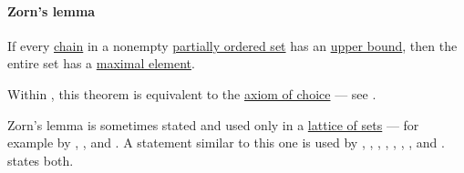 \paragraph{Zorn's lemma}

\begin{lemma}\label{thm:zorns_lemma}
  If every \hyperref[def:partial_order_chain]{chain} in a nonempty \hyperref[def:partially_ordered_set]{partially ordered set} has an \hyperref[def:extremal_points/bounds]{upper bound}, then the entire set has a \hyperref[def:extremal_points/maximal_and_minimal_element]{maximal element}.
\end{lemma}
\begin{comments}
  \item Within \hyperref[def:zfc]{}, this theorem is equivalent to the \hyperref[def:zfc/choice]{axiom of choice} --- see .

  \item Zorn's lemma is sometimes stated and used only in a \hyperref[thm:boolean_algebra_of_subsets]{lattice of sets} --- for example by , ,  and . A statement similar to this one is used by , , , , , , ,  and .  states both.
\end{comments}
